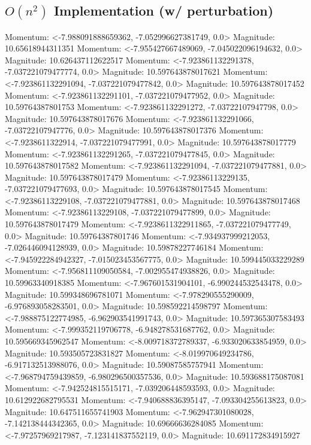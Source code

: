\documentclass[10pt]{article}
\begin{document}
\subsection{$O(n^2)$ Implementation (w/ perturbation)}
Momentum: <-7.988091888659362, -7.052996627381749, 0.0> Magnitude: 10.65618944311351
Momentum: <-7.955427667489069, -7.045022096194632, 0.0> Magnitude: 10.626437112622517
Momentum: <-7.923861132291378, -7.037221079477774, 0.0> Magnitude: 10.597643878017621
Momentum: <-7.923861132291094, -7.037221079477842, 0.0> Magnitude: 10.597643878017452
Momentum: <-7.923861132291101, -7.037221079477952, 0.0> Magnitude: 10.59764387801753
Momentum: <-7.923861132291272, -7.03722107947798, 0.0> Magnitude: 10.597643878017676
Momentum: <-7.923861132291066, -7.03722107947776, 0.0> Magnitude: 10.597643878017376
Momentum: <-7.9238611322914, -7.037221079477991, 0.0> Magnitude: 10.597643878017779
Momentum: <-7.923861132291265, -7.037221079477845, 0.0> Magnitude: 10.597643878017582
Momentum: <-7.923861132291094, -7.037221079477881, 0.0> Magnitude: 10.597643878017479
Momentum: <-7.92386113229135, -7.037221079477693, 0.0> Magnitude: 10.597643878017545
Momentum: <-7.92386113229108, -7.037221079477881, 0.0> Magnitude: 10.597643878017468
Momentum: <-7.92386113229108, -7.037221079477899, 0.0> Magnitude: 10.597643878017479
Momentum: <-7.9238611322911865, -7.037221079477749, 0.0> Magnitude: 10.59764387801746
Momentum: <-7.934937999212053, -7.026446094128939, 0.0> Magnitude: 10.59878227746184
Momentum: <-7.945922284942327, -7.015023453567775, 0.0> Magnitude: 10.599445033229289
Momentum: <-7.956811109050584, -7.002955474938826, 0.0> Magnitude: 10.59963340918385
Momentum: <-7.967601531904101, -6.990244532543478, 0.0> Magnitude: 10.599348696781071
Momentum: <-7.978290555290009, -6.976893058283501, 0.0> Magnitude: 10.598592214598797
Momentum: <-7.988875122774985, -6.962903541991743, 0.0> Magnitude: 10.597365307583493
Momentum: <-7.999352119706778, -6.948278531687762, 0.0> Magnitude: 10.595669345962547
Momentum: <-8.009718372789337, -6.933020633854959, 0.0> Magnitude: 10.593505723831827
Momentum: <-8.019970649234786, -6.917132513988076, 0.0> Magnitude: 10.59087585757941
Momentum: <-7.968794759439859, -6.980296500357536, 0.0> Magnitude: 10.593688175087081
Momentum: <-7.942524815515171, -7.039206448593593, 0.0> Magnitude: 10.612922682795531
Momentum: <-7.940688836395147, -7.093304255613823, 0.0> Magnitude: 10.647511655741903
Momentum: <-7.962947301080028, -7.142138444342365, 0.0> Magnitude: 10.69666636284085
Momentum: <-7.97257969217987, -7.123141837552119, 0.0> Magnitude: 10.691172834915927
\end{document}
